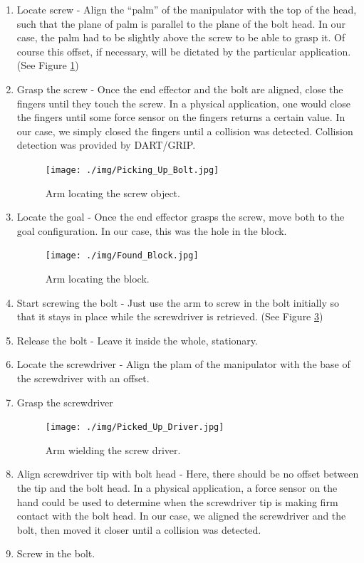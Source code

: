 \documentclass[10pt, conference]{IEEEtran}
\begin{document}
\begin{enumerate}
\item Locate screw - Align the “palm” of the manipulator with the top of
      the head, such that the plane of palm is parallel to the plane of
      the bolt head. In our case, the palm had to be slightly above the
      screw to be able to grasp it. Of course this offset, if necessary,
      will be dictated by the particular application. (See Figure
      \ref{fig:screw})
\item Grasp the screw - Once the end effector and the bolt are aligned,
      close the fingers until they touch the screw. In a physical
      application, one would close the fingers until some force sensor
      on the fingers returns a certain value. In our case, we simply
      closed the fingers until a collision was detected. Collision
      detection was provided by DART/GRIP.
      \begin{figure}[htb]
      \centering
      \texttt{[image: ./img/Picking\_Up\_Bolt.jpg]}
      \caption{\label{fig:screw}Arm locating the screw object.}
      \end{figure}
\item Locate the goal - Once the end effector grasps the screw, move
      both to the goal configuration. In our case, this was the hole in
      the block.
      \begin{figure}[htb]
      \centering
      \texttt{[image: ./img/Found\_Block.jpg]}
      \caption{\label{fig:block}Arm locating the block.}
      \end{figure}
\item Start screwing the bolt - Just use the arm to screw in the bolt
      initially so that it stays in place while the screwdriver is
      retrieved. (See Figure \ref{fig:driver})
\item Release the bolt - Leave it inside the whole, stationary.
\item Locate the screwdriver - Align the plam of the manipulator with the base of the screwdriver with an offset.
\item Grasp the screwdriver
      \begin{figure}[htb]
      \centering
      \texttt{[image: ./img/Picked\_Up\_Driver.jpg]}
      \caption{\label{fig:driver}Arm wielding the screw driver.}
      \end{figure}
\item Align screwdriver tip with bolt head - Here, there should be no
      offset between the tip and the bolt head. In a physical
      application, a force sensor on the hand could be used to determine
      when the screwdriver tip is making firm contact with the bolt
      head. In our case, we aligned the screwdriver and the bolt, then
      moved it closer until a collision was detected.
\item Screw in the bolt.
\end{enumerate}
\end{document}
